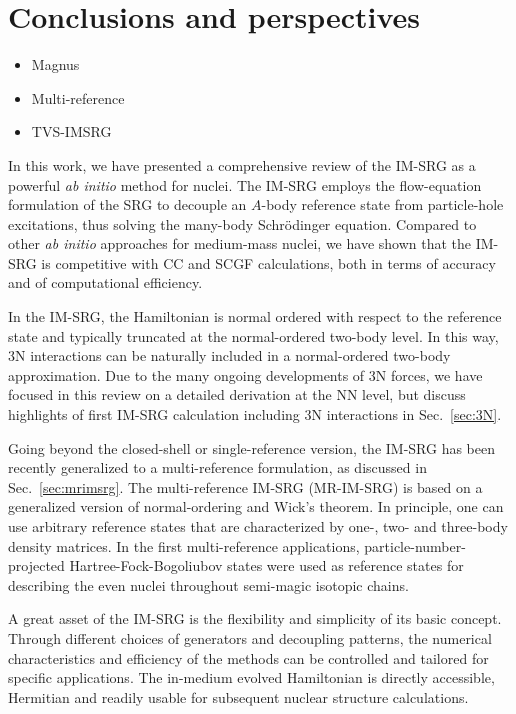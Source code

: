 \section{\label{sec:perspectives}Conclusions and perspectives}
\begin{itemize}
\item Magnus
\item Multi-reference
\item TVS-IMSRG
\end{itemize}


In this work, we have presented a comprehensive review of the IM-SRG
as a powerful \emph{ab initio} method for nuclei. The IM-SRG employs
the flow-equation formulation of the SRG to decouple an $A$-body
reference state from particle-hole excitations, thus solving the
many-body Schr\"odinger equation. Compared to other \emph{ab initio}
approaches for medium-mass nuclei, we have shown that the IM-SRG is
competitive with CC and SCGF calculations, both in terms of accuracy and of
computational efficiency.

In the IM-SRG, the Hamiltonian is normal ordered with respect to the
reference state and typically truncated at the normal-ordered two-body
level. In this way, 3N interactions can be naturally included in a
normal-ordered two-body approximation. Due to the many ongoing
developments of 3N forces, we have focused in this review on a
detailed derivation at the NN level, but discuss highlights of first
IM-SRG calculation including 3N interactions in Sec.~\ref{sec:3N}.

Going beyond the closed-shell or single-reference version, the IM-SRG
has been recently generalized to a multi-reference formulation, as
discussed in Sec.~\ref{sec:mrimsrg}. The multi-reference IM-SRG (MR-IM-SRG) is
based on a generalized version of normal-ordering and Wick's
theorem. In principle, one can use 
arbitrary reference states that are
characterized by one-, two- and three-body density matrices. In the
first multi-reference applications, particle-number-projected
Hartree-Fock-Bogoliubov states were used as reference states for
describing the even nuclei throughout semi-magic isotopic chains.

A great asset of the IM-SRG is the flexibility and simplicity of its
basic concept. Through different choices of generators and decoupling
patterns, the numerical characteristics and efficiency of the methods
can be controlled and tailored for specific applications. The
in-medium evolved Hamiltonian is directly accessible, Hermitian and readily
usable for subsequent nuclear structure calculations.

